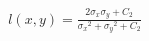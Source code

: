 \documentclass[preview]{standalone}
\begin{document}
\begin{align*}
l(x,y) = \frac{2\sigma_x\sigma_y + C_2}{{\sigma_x}^2 + {\sigma_y}^2 + C_2}
\end{align*}
\end{document}
